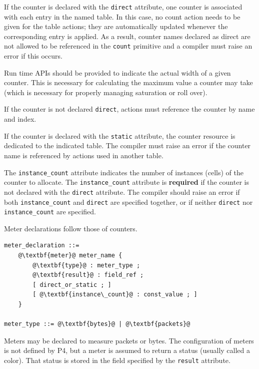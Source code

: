 \documentclass[12pt]{article}
\begin{document}
If the counter is declared with the \texttt{direct} attribute, one
counter is associated with each entry in the named table. In this
case, no count action needs to be given for the table actions; they
are automatically updated whenever the corresponding entry is
applied. As a result, counter names declared as direct are not allowed
to be referenced in the \texttt{count} primitive and a compiler must
raise an error if this occurs.

Run time APIs should be provided to indicate the actual width of a
given counter.  This is necessary for calculating the maximum value a
counter may take (which is necessary for properly managing saturation
or roll over).

If the counter is not declared \texttt{direct}, actions must reference
the counter by name and index.

If the counter is declared with the \texttt{static} attribute, the
counter resource is dedicated to the indicated table. The compiler
must raise an error if the counter name is referenced by actions used
in another table.

The \texttt{instance_count} attribute indicates the number of
instances (cells) of the counter to allocate. The
\texttt{instance_count} attribute is \textbf{required} if the counter
is not declared with the \texttt{direct} attribute.  The compiler
should raise an error if both \texttt{instance_count} and
\texttt{direct} are specified together, or if neither \texttt{direct}
nor \texttt{instance_count} are specified.  


Meter declarations follow those of counters.

\begin{lstlisting}[frame=single,backgroundcolor=\color{bnfgreen},escapechar=\@]
meter_declaration ::= 
    @\textbf{meter}@ meter_name {
        @\textbf{type}@ : meter_type ;
        @\textbf{result}@ : field_ref ;
        [ direct_or_static ; ]
        [ @\textbf{instance\_count}@ : const_value ; ]
    }

meter_type ::= @\textbf{bytes}@ | @\textbf{packets}@
\end{lstlisting}



Meters may be declared to measure packets or bytes. The configuration
of meters is not defined by P4, but a meter is assumed to return a
status (usually called a color). That status is stored in the field
specified by the \texttt{result} attribute.
\end{document}
